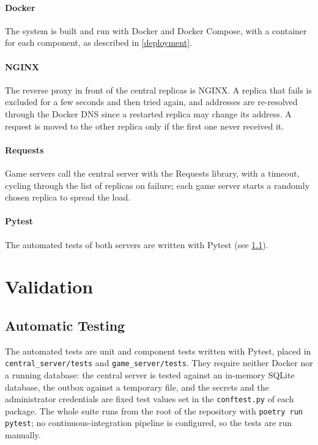 \documentclass{scrartcl}
\begin{document}
\paragraph{Docker}
The system is built and run with Docker and Docker Compose, with a container for each component, as described in \cref{deployment}.

\paragraph{NGINX}
The reverse proxy in front of the central replicas is NGINX.
A replica that fails is excluded for a few seconds and then tried again, and addresses are re-resolved through the Docker DNS since a restarted replica may change its address.
A request is moved to the other replica only if the first one never received it.

\paragraph{Requests}
Game servers call the central server with the Requests library, with a timeout, cycling through the list of replicas on failure; each game server starts a randomly chosen replica to spread the load.

\paragraph{Pytest}
The automated tests of both servers are written with Pytest (see \cref{automatic-testing}).


\section{Validation}\label{validation}

\subsection{Automatic Testing}\label{automatic-testing}

The automated tests are unit and component tests written with Pytest, placed in \texttt{central\_server/tests} and \texttt{game\_server/tests}.
They require neither Docker nor a running database: the central server is tested against an in-memory SQLite database, the outbox against a temporary file, 
and the secrets and the administrator credentials are fixed test values set in the \texttt{conftest.py} of each package.
The whole suite runs from the root of the repository with \texttt{poetry run pytest}; no continuous-integration pipeline is configured, so the tests are run manually.
\end{document}
